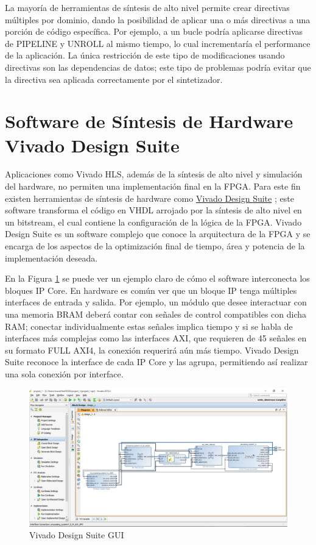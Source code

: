 La mayoría de herramientas de síntesis de alto nivel permite crear directivas múltiples por dominio, dando la posibilidad de aplicar una o más directivas a una porción de código específica. Por ejemplo, a un bucle podría aplicarse directivas de PIPELINE y UNROLL al mismo tiempo, lo cual incrementaría el performance de la aplicación. La única restricción de este tipo de modificaciones usando directivas son las dependencias de datos; este tipo de problemas podría evitar que la directiva sea aplicada correctamente por el sintetizador.

\section{Software de Síntesis de Hardware Vivado Design Suite}

Aplicaciones como Vivado HLS, además de la síntesis de alto nivel y simulación del hardware, no permiten una implementación final en la FPGA. Para este fin existen herramientas de síntesis de hardware como \href{http://www.xilinx.com/products/design-tools/vivado.html}{Vivado Design Suite} \citep{Vivad98}; este software transforma el código en VHDL arrojado por la síntesis de alto nivel en un bitstream, el cual contiene la configuración de la lógica de la FPGA. Vivado Design Suite es un software complejo que conoce la arquitectura de la FPGA y se encarga de los aspectos de la optimización final de tiempo, área y potencia de la implementación deseada.

En la Figura \ref{fig:HLS9} se puede ver un ejemplo claro de cómo el software interconecta los bloques IP Core. En hardware es común ver que un bloque IP tenga múltiples interfaces de entrada y salida. Por ejemplo, un módulo que desee interactuar con una memoria BRAM deberá contar con señales de control compatibles con dicha RAM; conectar individualmente estas señales implica tiempo y si se habla de interfaces más complejas como las interfaces AXI, que requieren de 45 señales en su formato FULL AXI4, la conexión requerirá aún más tiempo. Vivado Design Suite reconoce la interface de cada IP Core y las agrupa, permitiendo así realizar una sola conexión por interface.

\begin{figure}[H]
  \centering
    \includegraphics[scale=0.4]{./Figures/HLS9.pdf}
  \caption{Vivado Design Suite GUI}
  \label{fig:HLS9}
\end{figure}

